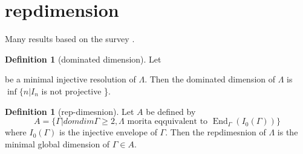 \documentclass[11pt, a4paper, english]{article}
\theoremstyle{definition}
\newtheorem{defn}[theorem]{Definition}
\DeclareMathOperator{\End}{End}
\begin{document}
\section{repdimension}

Many results based on the survey \cite{Opp09}.

\begin{defn}[dominated dimension]
	Let 
	be a minimal injective resolution of $\Lambda$. Then the dominated dimension of $\Lambda$ is $\inf\{n | I_n$ is not projective \}.
\end{defn}

\begin{defn}[rep-dimesnion] 
	Let $A$ be defined by $$A = \{\Gamma | domdim\Gamma \geq 2, \Lambda \text{ morita eqquivalent to } \End_\Gamma(I_0(\Gamma))\}$$ where $I_0(\Gamma)$ is the injective envelope of $\Gamma$. Then the repdimesnion of $\Lambda$ is the minimal global dimension of $\Gamma \in A$.
\end{defn}
\end{document}
